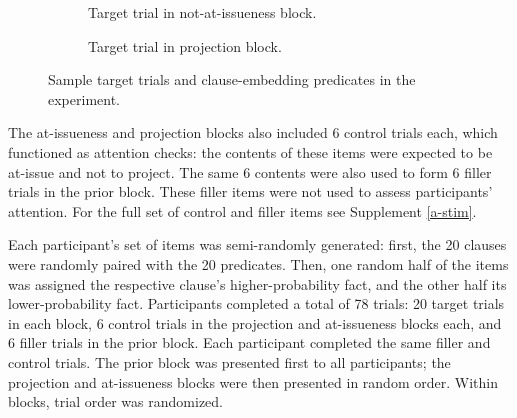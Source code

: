\documentclass[11pt,fleqn]{article}
\newcommand{\6}{\mbox{$[\hspace*{-.6mm}[$}}
\newcommand{\9}{\mbox{$]\hspace*{-.6mm}]$}}
\begin{document}
\begin{figure}[h!]
\begin{subfigure}[t]{0.5\textwidth}
\caption{Target trial in not-at-issueness block.}\label{fig-exp1-nai}
 \end{subfigure}%
 \begin{subfigure}[t]{0.5\textwidth}
\par\bigskip
\centering
\caption{Target trial in projection block.}\label{fig-exp1-projection}
 \end{subfigure}

\caption{Sample target trials and clause-embedding predicates in the experiment.}
\end{figure}

The at-issueness and projection blocks also included 6 control trials each, which functioned as attention checks: the contents of these items were expected to be at-issue and not to project. The same 6 contents were also used to form 6 filler trials in the prior block. These filler items were not used to assess participants' attention. For the full set of control and filler items see Supplement \ref{a-stim}.

Each participant's set of items was semi-randomly generated: first, the 20 clauses were randomly paired with the 20 predicates. Then, one random half of the items was assigned the respective clause's higher-probability fact, and the other half its lower-probability fact. Participants completed a total of 78 trials: 20 target trials in each block, 6 control trials in the projection and at-issueness blocks each, and 6 filler trials in the prior block. Each participant completed the same filler and control trials. The prior block was presented first to all participants; the projection and at-issueness blocks were then presented in random order. Within blocks, trial order was randomized.
\end{document}
